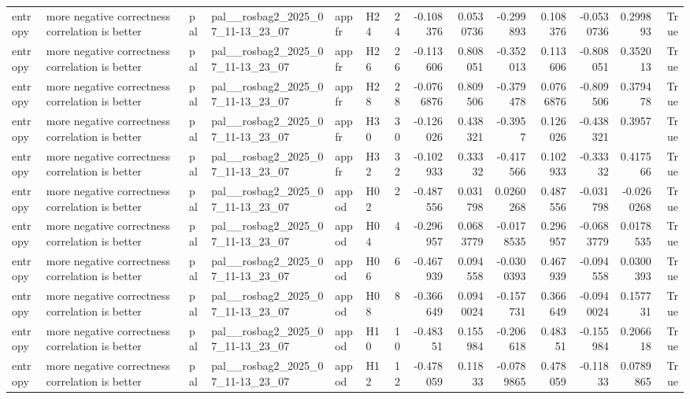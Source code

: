 \begin{longtable}{llllllrrrrrrrr}
entropy & more negative correctness correlation is better & pal & pal\_\_rosbag2\_2025\_07\_11-13\_23\_07 & appfr & H24 & 24 & -0.108376 & 0.0530736 & -0.299893 & 0.108376 & -0.0530736 & 0.299893 & True \\
entropy & more negative correctness correlation is better & pal & pal\_\_rosbag2\_2025\_07\_11-13\_23\_07 & appfr & H26 & 26 & -0.113606 & 0.808051 & -0.352013 & 0.113606 & -0.808051 & 0.352013 & True \\
entropy & more negative correctness correlation is better & pal & pal\_\_rosbag2\_2025\_07\_11-13\_23\_07 & appfr & H28 & 28 & -0.0766876 & 0.809506 & -0.379478 & 0.0766876 & -0.809506 & 0.379478 & True \\
entropy & more negative correctness correlation is better & pal & pal\_\_rosbag2\_2025\_07\_11-13\_23\_07 & appfr & H30 & 30 & -0.126026 & 0.438321 & -0.3957 & 0.126026 & -0.438321 & 0.3957 & True \\
entropy & more negative correctness correlation is better & pal & pal\_\_rosbag2\_2025\_07\_11-13\_23\_07 & appfr & H32 & 32 & -0.102933 & 0.33332 & -0.417566 & 0.102933 & -0.33332 & 0.417566 & True \\
entropy & more negative correctness correlation is better & pal & pal\_\_rosbag2\_2025\_07\_11-13\_23\_07 & appod & H02 & 2 & -0.487556 & 0.031798 & 0.0260268 & 0.487556 & -0.031798 & -0.0260268 & True \\
entropy & more negative correctness correlation is better & pal & pal\_\_rosbag2\_2025\_07\_11-13\_23\_07 & appod & H04 & 4 & -0.296957 & 0.0683779 & -0.0178535 & 0.296957 & -0.0683779 & 0.0178535 & True \\
entropy & more negative correctness correlation is better & pal & pal\_\_rosbag2\_2025\_07\_11-13\_23\_07 & appod & H06 & 6 & -0.467939 & 0.094558 & -0.0300393 & 0.467939 & -0.094558 & 0.0300393 & True \\
entropy & more negative correctness correlation is better & pal & pal\_\_rosbag2\_2025\_07\_11-13\_23\_07 & appod & H08 & 8 & -0.366649 & 0.0940024 & -0.157731 & 0.366649 & -0.0940024 & 0.157731 & True \\
entropy & more negative correctness correlation is better & pal & pal\_\_rosbag2\_2025\_07\_11-13\_23\_07 & appod & H10 & 10 & -0.48351 & 0.155984 & -0.206618 & 0.48351 & -0.155984 & 0.206618 & True \\
entropy & more negative correctness correlation is better & pal & pal\_\_rosbag2\_2025\_07\_11-13\_23\_07 & appod & H12 & 12 & -0.478059 & 0.11833 & -0.0789865 & 0.478059 & -0.11833 & 0.0789865 & True \\

\end{longtable}

